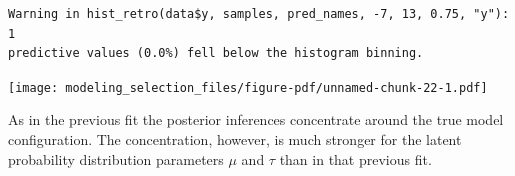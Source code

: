 \documentclass[
  letterpaper,
  DIV=11,
  numbers=noendperiod]{scrartcl}
\newenvironment{Shaded}{\begin{snugshade}}{\end{snugshade}}
\newcommand{\AttributeTok}[1]{\textcolor[rgb]{0.40,0.45,0.13}{#1}}
\newcommand{\DecValTok}[1]{\textcolor[rgb]{0.68,0.00,0.00}{#1}}
\newcommand{\FunctionTok}[1]{\textcolor[rgb]{0.28,0.35,0.67}{#1}}
\newcommand{\NormalTok}[1]{\textcolor[rgb]{0.00,0.23,0.31}{#1}}
\newcommand{\SpecialCharTok}[1]{\textcolor[rgb]{0.37,0.37,0.37}{#1}}
\newcommand{\StringTok}[1]{\textcolor[rgb]{0.13,0.47,0.30}{#1}}
\begin{document}
\begin{verbatim}
Warning in hist_retro(data$y, samples, pred_names, -7, 13, 0.75, "y"): 1
predictive values (0.0%) fell below the histogram binning.
\end{verbatim}

\begin{Shaded}
\end{Shaded}

\texttt{[image: modeling\_selection\_files/figure-pdf/unnamed-chunk-22-1.pdf]}

As in the previous fit the posterior inferences concentrate around the
true model configuration. The concentration, however, is much stronger
for the latent probability distribution parameters \(\mu\) and \(\tau\)
than in that previous fit.
\end{document}
